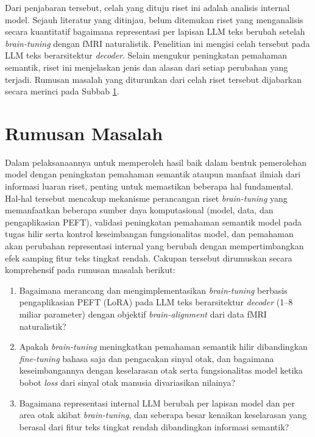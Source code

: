 Dari penjabaran tersebut, celah yang dituju riset ini adalah analisis internal model. Sejauh literatur yang ditinjau, belum ditemukan riset yang menganalisis secara kuantitatif bagaimana representasi per lapisan LLM teks berubah setelah \textit{brain-tuning} dengan fMRI naturalistik. Penelitian ini mengisi celah tersebut pada LLM teks berarsitektur \textit{decoder}. Selain mengukur peningkatan pemahaman semantik, riset ini menjelaskan jenis dan alasan dari setiap perubahan yang terjadi. Rumusan masalah yang diturunkan dari celah riset tersebut dijabarkan secara merinci pada Subbab \ref{chap:pd_rm}.

\section{Rumusan Masalah}
\label{chap:pd_rm}
Dalam pelaksanaannya untuk memperoleh hasil baik dalam bentuk pemerolehan model dengan peningkatan pemahaman semantik ataupun manfaat ilmiah dari informasi luaran riset, penting untuk memastikan beberapa hal fundamental. Hal-hal tersebut mencakup mekanisme perancangan riset \textit{brain-tuning} yang memanfaatkan beberapa sumber daya komputasional (model, data, dan pengaplikasian PEFT), validasi peningkatan pemahaman semantik model pada tugas hilir serta kontrol keseimbangan fungsionalitas model, dan pemahaman akan perubahan representasi internal yang berubah dengan mempertimbangkan efek samping fitur teks tingkat rendah. Cakupan tersebut dirumuskan secara komprehensif pada rumusan masalah berikut:

\begin{enumerate}[label=RM\arabic*.]
    \item Bagaimana merancang dan mengimplementasikan \textit{brain-tuning} berbasis pengaplikasian PEFT (LoRA) pada LLM teks berarsitektur \textit{decoder} (1--8 miliar parameter) dengan objektif \textit{brain-alignment} dari data fMRI naturalistik?
    \item Apakah \textit{brain-tuning} meningkatkan pemahaman semantik hilir dibandingkan \textit{fine-tuning} bahasa saja dan pengacakan sinyal otak, dan bagaimana keseimbangannya dengan keselarasan otak serta fungsionalitas model ketika bobot \textit{loss} dari sinyal otak manusia divariasikan nilainya?
    \item Bagaimana representasi internal LLM berubah per lapisan model dan per area otak akibat \textit{brain-tuning}, dan seberapa besar kenaikan keselarasan yang berasal dari fitur teks tingkat rendah dibandingkan informasi semantik?
\end{enumerate}

